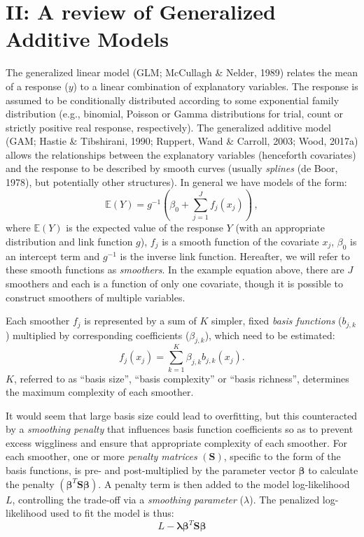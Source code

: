 \documentclass[12pt]{article}
\begin{document}
\FloatBarrier

\section{II: A review of Generalized Additive
Models}\label{ii-a-review-of-generalized-additive-models}

The generalized linear model (GLM; McCullagh \& Nelder, 1989) relates
the mean of a response (\(y\)) to a linear combination of explanatory
variables. The response is assumed to be conditionally distributed
according to some exponential family distribution (e.g., binomial,
Poisson or Gamma distributions for trial, count or strictly positive
real response, respectively). The generalized additive model (GAM;
Hastie \& Tibshirani, 1990; Ruppert, Wand \& Carroll, 2003; Wood, 2017a)
allows the relationships between the explanatory variables (henceforth
covariates) and the response to be described by smooth curves (usually
\emph{splines} (de Boor, 1978), but potentially other structures). In
general we have models of the form: \[
\mathbb{E}\left( Y \right) = g^{-1}\left( \beta_0 + \sum_{j=1}^J f_j(x_j) \right)\,,
\] where \(\mathbb{E}(Y)\) is the expected value of the response \(Y\)
(with an appropriate distribution and link function \(g\)), \(f_j\) is a
smooth function of the covariate \(x_j\), \(\beta_0\) is an intercept
term and \(g^{-1}\) is the inverse link function. Hereafter, we will
refer to these smooth functions as \emph{smoothers}. In the example
equation above, there are \(J\) smoothers and each is a function of only
one covariate, though it is possible to construct smoothers of multiple
variables.

Each smoother \(f_j\) is represented by a sum of \(K\) simpler, fixed
\emph{basis functions} (\(b_{j,k}\)) multiplied by corresponding
coefficients (\(\beta_{j,k}\)), which need to be estimated: \[
f_j(x_j) = \sum_{k=1}^K \beta_{j,k} b_{j,k}(x_j).
\] \(K\), referred to as ``basis size'', ``basis complexity'' or ``basis
richness'', determines the maximum complexity of each smoother.

It would seem that large basis size could lead to overfitting, but this
counteracted by a \emph{smoothing penalty} that influences basis
function coefficients so as to prevent excess wiggliness and ensure that
appropriate complexity of each smoother. For each smoother, one or more
\emph{penalty matrices} \((\mathbf{S})\), specific to the form of the
basis functions, is pre- and post-multiplied by the parameter vector
\(\boldsymbol{\beta}\) to calculate the penalty
\((\boldsymbol{\beta}^T \mathbf{S} \boldsymbol{\beta})\). A penalty term
is then added to the model log-likelihood \(L\), controlling the
trade-off via a \emph{smoothing parameter} (\(\lambda\)). The penalized
log-likelihood used to fit the model is thus: \[
L - \boldsymbol{\lambda} \boldsymbol{\beta}^T \mathbf{S} \boldsymbol{\beta}
\]
\end{document}
